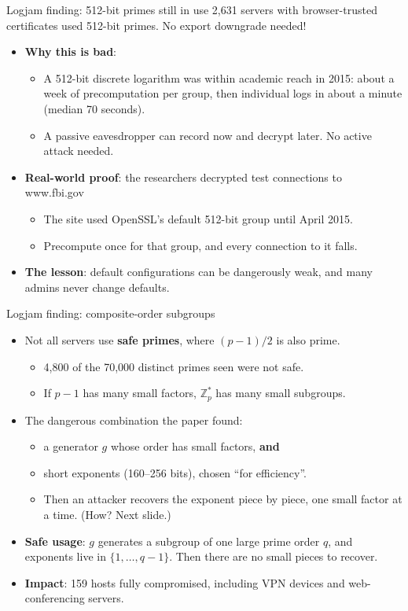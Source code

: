 \ifdefined\PRESENTATION\else\PassOptionsToClass{handout}{beamer}\fi\documentclass[aspectratio=169, lualatex]{beamer}
\begin{document}
\begin{frame}{Logjam finding: 512-bit primes still in use}
	2,631 servers with browser-trusted certificates used 512-bit primes. No export downgrade needed!
	\begin{itemize}[<+->]
		\item \textbf{Why this is bad}:
		      \begin{itemize}
			      \item A 512-bit discrete logarithm was within academic reach in 2015: about a week of precomputation per group, then individual logs in about a minute (median 70 seconds).
			      \item A passive eavesdropper can record now and decrypt later. No active attack needed.
		      \end{itemize}
		\item \textbf{Real-world proof}: the researchers decrypted test connections to www.fbi.gov
		      \begin{itemize}
			      \item The site used OpenSSL's default 512-bit group until April 2015.
			      \item Precompute once for that group, and every connection to it falls.
		      \end{itemize}
		\item \textbf{The lesson}: default configurations can be dangerously weak, and many admins never change defaults.
	\end{itemize}
\end{frame}

\begin{frame}{Logjam finding: composite-order subgroups}
	\begin{itemize}[<+->]
		\item Not all servers use \textbf{safe primes}, where $(p-1)/2$ is also prime.
		      \begin{itemize}
			      \item 4,800 of the 70,000 distinct primes seen were not safe.
			      \item If $p-1$ has many small factors, $\mathbb{Z}_p^*$ has many small subgroups.
		      \end{itemize}
		\item The dangerous combination the paper found:
		      \begin{itemize}
			      \item a generator $g$ whose order has small factors, \textbf{and}
			      \item short exponents (160--256 bits), chosen ``for efficiency''.
			      \item Then an attacker recovers the exponent piece by piece, one small factor at a time. (How? Next slide.)
		      \end{itemize}
		\item \textbf{Safe usage}: $g$ generates a subgroup of one large prime order $q$, and exponents live in $\{1, \ldots, q-1\}$. Then there are no small pieces to recover.
		\item \textbf{Impact}: 159 hosts fully compromised, including VPN devices and web-conferencing servers.
	\end{itemize}
\end{frame}
\end{document}
